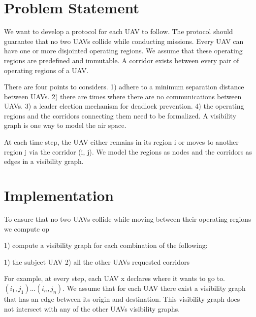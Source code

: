 \documentclass{refart}
\begin{document}
\section{Problem Statement}

We want to develop a protocol for each UAV to follow. The protocol should guarantee that no two UAVs collide while conducting missions. Every UAV can have one or more disjointed operating regions. We assume that these operating regions are predefined and immutable. A corridor exists between every pair of operating regions of a UAV.

There are four points to considers. 1) adhere to a minimum separation distance between UAVs. 2) there are times where there are no communications between UAVs. 3) a leader election mechanism for deadlock prevention. 4) the operating regions and the corridors connecting them need to be formalized. A visibility graph is one way to model the air space.

At each time step, the UAV either remains in its region i or moves to another region j via the corridor (i, j). We model the regions as nodes and the corridors as edges in a visibility graph.

\section{Implementation}

To ensure that no two UAVs collide while moving between their operating regions we compute op

1) compute a visibility graph for each combination of the following:

1) the subject UAV
2) all the other UAVs requested corridors

For example, at every step, each UAV x declares where it wants to go to.  $(i_1,j_1) ... (i_n,j_n)$. We assume that for each UAV there exist a visibility graph that has an edge between its origin and destination. This visibility graph does not intersect with any of the other UAVs visibility graphs.
\end{document}
